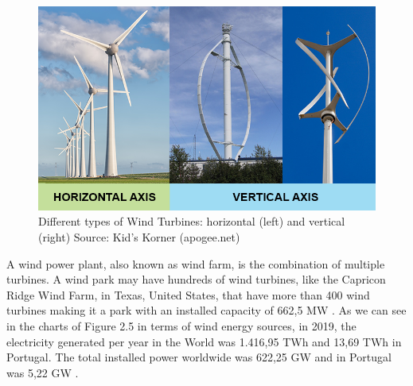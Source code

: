 \begin{figure}[]
	\centering
	\includegraphics[width=\textwidth]{Chapters/Figures/background_fig5.png}
	\caption{Different types of Wind Turbines: horizontal (left) and vertical (right) Source: Kid's Korner (apogee.net) }
	\label{fig:Figuras_Tree_silhouettes-vectorial}
\end{figure}



A wind power plant, also known as wind farm, is the combination of multiple turbines. A wind park may have hundreds of wind turbines, like the Capricon Ridge Wind Farm, in Texas, United States, that have more than 400 wind turbines making it a park with an installed capacity of 662,5 MW \cite{OLD_35_WIND}.
As we can see in the charts of Figure 2.5 in terms of wind energy sources, in 2019, the electricity generated per year in the World was 1.416,95 TWh and 13,69 TWh in Portugal. The total installed power worldwide was 622,25 GW and in Portugal was 5,22 GW \cite{OLD_33_GENERAL}.


